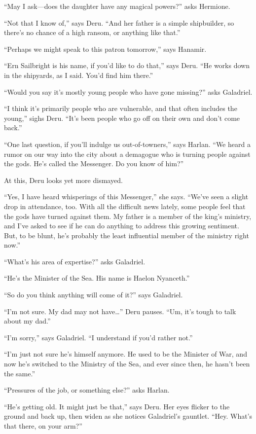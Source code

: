 \documentclass[smalldemyvopaper,11pt,twoside,onecolumn,openright,extrafontsizes]{memoir}
\newlength\drop
\begin{document}
``May I ask---does the daughter have any magical powers?'' asks
Hermione.

``Not that I know of,'' says Deru. ``And her father is a simple
shipbuilder, so there's no chance of a high ransom, or anything like
that.''

``Perhaps we might speak to this patron tomorrow,'' says Hanamir.

``Ern Sailbright is his name, if you'd like to do that,'' says Deru.
``He works down in the shipyards, as I said. You'd find him there.''

``Would you say it's mostly young people who have gone missing?'' asks
Galadriel.

``I think it's primarily people who are vulnerable, and that often
includes the young,'' sighs Deru. ``It's been people who go off on their
own and don't come back.''

``One last question, if you'll indulge us out-of-towners,'' says Harlan.
``We heard a rumor on our way into the city about a demagogue who is
turning people against the gods. He's called the Messenger. Do you know
of him?''

At this, Deru looks yet more dismayed.

``Yes, I have heard whisperings of this Messenger,'' she says. ``We've
seen a slight drop in attendance, too. With all the difficult news
lately, some people feel that the gods have turned against them. My
father is a member of the king's ministry, and I've asked to see if he
can do anything to address this growing sentiment. But, to be blunt,
he's probably the least influential member of the ministry right now.''

``What's his area of expertise?'' asks Galadriel.

``He's the Minister of the Sea. His name is Haelon Nyanceth.''

``So do you think anything will come of it?'' says Galadriel.

``I'm not sure. My dad may not have\ldots{}'' Deru pauses. ``Um, it's
tough to talk about my dad.''

``I'm sorry,'' says Galadriel. ``I understand if you'd rather not.''

``I'm just not sure he's himself anymore. He used to be the Minister of
War, and now he's switched to the Ministry of the Sea, and ever since
then, he hasn't been the same.''

``Pressures of the job, or something else?'' asks Harlan.

``He's getting old. It might just be that,'' says Deru. Her eyes flicker
to the ground and back up, then widen as she notices Galadriel's
gauntlet. ``Hey. What's that there, on your arm?''
\end{document}
